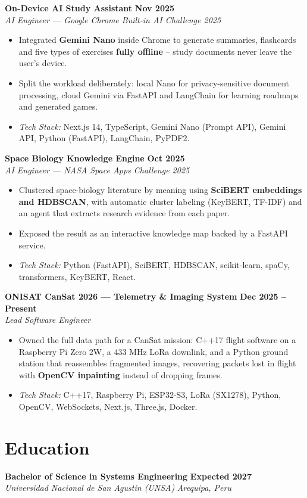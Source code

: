 \documentclass[11pt,letterpaper]{article}
\newcommand{\cventry}[4]{%
  \textbf{#1} \hfill \textbf{#2}\\
  \textit{#3} \hfill \textit{#4}\par\nobreak\vspace{1pt}%
}
\begin{document}
\cventry{On-Device AI Study Assistant}{Nov 2025}{AI Engineer --- Google Chrome Built-in AI Challenge 2025}{}
\begin{itemize}
  \item Integrated \textbf{Gemini Nano} inside Chrome to generate summaries, flashcards and five types of exercises \textbf{fully offline} -- study documents never leave the user's device.
  \item Split the workload deliberately: local Nano for privacy-sensitive document processing, cloud Gemini via FastAPI and LangChain for learning roadmaps and generated games.
  \item \textit{Tech Stack:} Next.js 14, TypeScript, Gemini Nano (Prompt API), Gemini API, Python (FastAPI), LangChain, PyPDF2.
\end{itemize}

\cventry{Space Biology Knowledge Engine}{Oct 2025}{AI Engineer --- NASA Space Apps Challenge 2025}{}
\begin{itemize}
  \item Clustered space-biology literature by meaning using \textbf{SciBERT embeddings and HDBSCAN}, with automatic cluster labeling (KeyBERT, TF-IDF) and an agent that extracts research evidence from each paper.
  \item Exposed the result as an interactive knowledge map backed by a FastAPI service.
  \item \textit{Tech Stack:} Python (FastAPI), SciBERT, HDBSCAN, scikit-learn, spaCy, transformers, KeyBERT, React.
\end{itemize}

\cventry{ONISAT CanSat 2026 --- Telemetry \& Imaging System}{Dec 2025 -- Present}{Lead Software Engineer}{}
\begin{itemize}
  \item Owned the full data path for a CanSat mission: C++17 flight software on a Raspberry Pi Zero 2W, a 433 MHz LoRa downlink, and a Python ground station that reassembles fragmented images, recovering packets lost in flight with \textbf{OpenCV inpainting} instead of dropping frames.
  \item \textit{Tech Stack:} C++17, Raspberry Pi, ESP32-S3, LoRa (SX1278), Python, OpenCV, WebSockets, Next.js, Three.js, Docker.
\end{itemize}

\section{Education}
\cventry{Bachelor of Science in Systems Engineering}{Expected 2027}{Universidad Nacional de San Agustin (UNSA)}{Arequipa, Peru}
\end{document}
